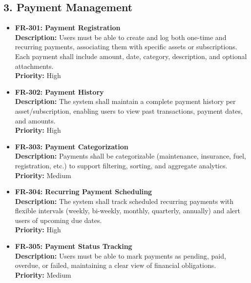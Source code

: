 \documentclass[11pt, a4paper]{article}
\newcommand{\reqid}[1]{\textbf{\color{PrimaryColor}#1}}
\begin{document}
	\subsection{3. Payment Management}
	\begin{itemize}
		\item \reqid{FR-301: Payment Registration} \\
		\textbf{Description:} Users must be able to create and log both one-time and recurring payments, associating them with specific assets or subscriptions. Each payment shall include amount, date, category, description, and optional attachments. \\
		\textbf{Priority:} High
		
		\item \reqid{FR-302: Payment History} \\
		\textbf{Description:} The system shall maintain a complete payment history per asset/subscription, enabling users to view past transactions, payment dates, and amounts. \\
		\textbf{Priority:} High
		
		\item \reqid{FR-303: Payment Categorization} \\
		\textbf{Description:} Payments shall be categorizable (maintenance, insurance, fuel, registration, etc.) to support filtering, sorting, and aggregate analytics. \\
		\textbf{Priority:} Medium
		
		\item \reqid{FR-304: Recurring Payment Scheduling} \\
		\textbf{Description:} The system shall track scheduled recurring payments with flexible intervals (weekly, bi-weekly, monthly, quarterly, annually) and alert users of upcoming due dates. \\
		\textbf{Priority:} High
		
		\item \reqid{FR-305: Payment Status Tracking} \\
		\textbf{Description:} Users must be able to mark payments as pending, paid, overdue, or failed, maintaining a clear view of financial obligations. \\
		\textbf{Priority:} Medium
	\end{itemize}
	
\end{document}

